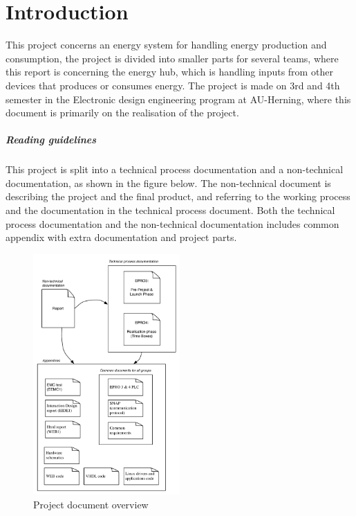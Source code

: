 \chapter{Introduction}
This project concerns an energy system for handling energy production and consumption, the project is divided into smaller parts for several teams, where this report is concerning the energy hub, which is handling inputs from other devices that produces or consumes energy. The project is made on 3rd and 4th semester in the Electronic design engineering program at AU-Herning, where this document is primarily on the realisation of the project.
\paragraph{Reading guidelines}
This project is split into a technical process documentation and a non-technical documentation, as shown in the figure below. The non-technical document is describing the project and the final product, and referring to the working process and the documentation in the technical process document. Both the technical process documentation and the non-technical documentation includes common appendix with extra documentation and project parts.
\begin{figure}[H]
	\begin{centering}
		 \includegraphics[width=0.5\textwidth]{images/report_ref.pdf}
		\caption*{Project document overview}
	\end{centering}
\end{figure}
